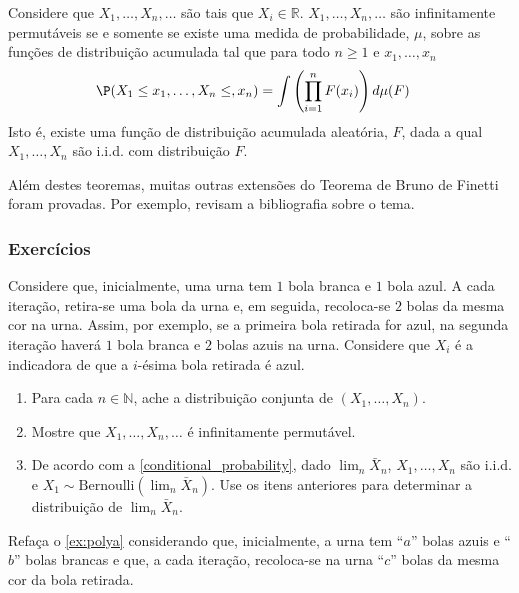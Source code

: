 \begin{theorem}
 \label{thm:definetti-geral}
 Considere que $X_1,\ldots,X_n,\ldots$ são
 tais que $X_i \in \mathbb{R}$.
 $X_1,\ldots,X_n,\ldots$ são
 infinitamente permutáveis se e somente se
 existe uma medida de probabilidade, $\mu$,
 sobre as funções de distribuição acumulada tal que
 para todo $n \geq 1$ e $x_1, \ldots, x_n$
 \begin{align*}
  \P(X_1 \leq x_1, \ldots, X_n \leq, x_n)
  &= \int \left(\prod_{i=1}^n F(x_i)\right) d\mu(F)
 \end{align*}
 Isto é, existe uma função de distribuição acumulada aleatória, $F$,
 dada a qual $X_1, \ldots, X_n$ são i.i.d. com distribuição $F$.
\end{theorem}

Além destes teoremas, muitas outras extensões do 
Teorema de Bruno de Finetti foram provadas.
Por exemplo, \citet{Kingman1978,Aldous1985} revisam
a bibliografia sobre o tema.

\subsubsection*{Exercícios}

\begin{exercise}
 \label{ex:polya}
 Considere que, inicialmente, uma urna tem
 $1$ bola branca e $1$ bola azul. A cada iteração,
 retira-se uma bola da urna e, em seguida, 
 recoloca-se $2$ bolas da mesma cor na urna.
 Assim, por exemplo, se a primeira bola retirada for azul,
 na segunda iteração haverá $1$ bola branca e
 $2$ bolas azuis na urna. Considere que
 $X_{i}$ é a indicadora de que a
 $i$-ésima bola retirada é azul.
 \begin{enumerate}[label=(\alph*)]
  \item Para cada $n \in \mathbb{N}$, ache a
  distribuição conjunta de $(X_{1},\ldots,X_{n})$.
  \item Mostre que $X_{1},\ldots,X_{n},\ldots$ é
  infinitamente permutável.
  \item De acordo com a \cref{conditional_probability},
  dado $\lim_{n}\bar{X}_{n}$,
  $X_{1},\ldots,X_{n}$ são i.i.d. e
  $X_{1} \sim \text{Bernoulli}(\lim_{n}\bar{X}_{n})$.
  Use os itens anteriores para determinar a
  distribuição de $\lim_{n}\bar{X}_{n}$.
 \end{enumerate}
\end{exercise}

\begin{exercise}
 Refaça o \cref{ex:polya} considerando que, inicialmente,
 a urna tem ``$a$'' bolas azuis e
 ``$b$'' bolas brancas e que, a cada iteração,
 recoloca-se na urna ``$c$'' bolas 
 da mesma cor da bola retirada. 
\end{exercise}

